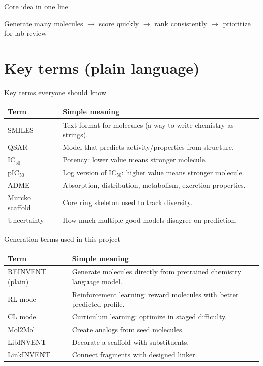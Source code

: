 \documentclass[aspectratio=169,10pt]{beamer}
\begin{document}
\begin{frame}{Core idea in one line}
  \begin{center}
    \Large
    Generate many molecules \(\rightarrow\) score quickly \(\rightarrow\)
    rank consistently \(\rightarrow\) prioritize for lab review
  \end{center}
\end{frame}

\section{Key terms (plain language)}

\begin{frame}{Key terms everyone should know}
  \begin{tabularx}{\textwidth}{lX}
    \toprule
    \textbf{Term} & \textbf{Simple meaning} \\
    \midrule
    SMILES & Text format for molecules (a way to write chemistry as strings). \\
    QSAR & Model that predicts activity/properties from structure. \\
    IC\(_{50}\) & Potency: lower value means stronger molecule. \\
    pIC\(_{50}\) & Log version of IC\(_{50}\): higher value means stronger molecule. \\
    ADME & Absorption, distribution, metabolism, excretion properties. \\
    Murcko scaffold & Core ring skeleton used to track diversity. \\
    Uncertainty & How much multiple good models disagree on prediction. \\
    \bottomrule
  \end{tabularx}
\end{frame}

\begin{frame}{Generation terms used in this project}
  \begin{tabularx}{\textwidth}{lX}
    \toprule
    \textbf{Term} & \textbf{Simple meaning} \\
    \midrule
    REINVENT (plain) & Generate molecules directly from pretrained chemistry language model. \\
    RL mode & Reinforcement learning: reward molecules with better predicted profile. \\
    CL mode & Curriculum learning: optimize in staged difficulty. \\
    Mol2Mol & Create analogs from seed molecules. \\
    LibINVENT & Decorate a scaffold with substituents. \\
    LinkINVENT & Connect fragments with designed linker. \\
    \bottomrule
  \end{tabularx}
\end{frame}
\end{document}
